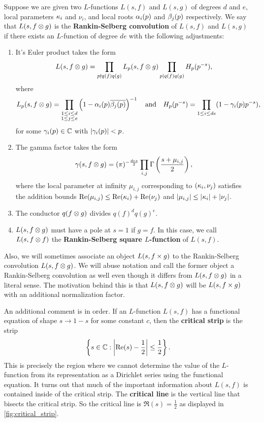       Suppose we are given two $L$-functions $L(s,f)$ and $L(s,g)$ of degrees $d$ and $e$, local parameters $\kappa_{i}$ and $\nu_{i}$, and local roots $\alpha_{i}(p)$ and $\beta_{j}(p)$ respectively. We say that $L(s,f \otimes g)$ is the \textbf{Rankin-Selberg convolution} of $L(s,f)$ and $L(s,g)$ if there exists an $L$-function of degree $de$ with the following adjustments:
      \begin{enumerate}[label=(\roman*)]
        \item It's Euler product takes the form
        \[
          L(s,f \otimes g) = \prod_{p \nmid q(f)q(g)}L_{p}(s,f \otimes g)\prod_{p \mid q(f)q(g)}H_{p}(p^{-s}),
        \]
        where
        \[
          L_{p}(s,f \otimes g) = \prod_{\substack{1 \le i \le d \\ 1 \le j \le e}}\left(1-\alpha_{i}(p)\overline{\beta_{j}(p)}\right)^{-1} \quad \text{and} \quad H_{p}(p^{-s}) = \prod_{1 \le i \le de}(1-\gamma_{i}(p)p^{-s}),
        \]
        for some $\gamma_{i}(p) \in \mathbb{C}$ with $|\gamma_{i}(p)| < p$.
        \item The gamma factor takes the form
        \[
          \gamma(s,f \otimes g) = (\pi)^{-\frac{des}{2}}\prod_{i,j}\Gamma\left(\frac{s+\mu_{i,j}}{2}\right),
        \]
        where the local parameter at infinity $\mu_{i,j}$ corresponding to $(\kappa_{i},\nu_{j})$ satisfies the addition bounds $\mathrm{Re}(\mu_{i,j}) \le \mathrm{Re}(\kappa_{i})+\mathrm{Re}(\nu_{j})$ and $|\mu_{i,j}| \le |\kappa_{i}|+|\nu_{j}|$.
        \item The conductor $q(f \otimes g)$ divides $q(f)^{d}q(g)^{e}$.
        \item $L(s,f \otimes g)$ must have a pole at $s = 1$ if $g = f$. In this case, we call $L(s,f \otimes f)$ the \textbf{Rankin-Selberg square $L$-function} of $L(s,f)$.
      \end{enumerate}
      Also, we will sometimes associate an object $L(s,f \times g)$ to the Rankin-Selberg convolution $L(s,f \otimes g)$. We will abuse notation and call the former object a Rankin-Selberg convolution as well even though it differs from $L(s,f \otimes g)$ in a literal sense. The motivation behind this is that $L(s,f \otimes g)$ will be $L(s,f \times g)$ with an additional normalization factor.

      An additional comment is in order. If an $L$-function $L(s,f)$ has a functional equation of shape $s \to 1-s$ for some constant $c$, then the \textbf{critical strip} is the strip
      \[
        \left\{s \in \mathbb{C}:\left|\mathrm{Re}(s)-\frac{1}{2}\right| \le \frac{1}{2}\right\}.
      \]
      This is precisely the region where we cannot determine the value of the $L$-function from its representation as a Dirichlet series using the functional equation. It turns out that much of the important information about $L(s,f)$ is contained inside of the critical strip. The \textbf{critical line} is the vertical line that bisects the critical strip. So the critical line is $\Re(s) = \frac{1}{2}$ as displayed in \cref{fig:critical_strip}.

